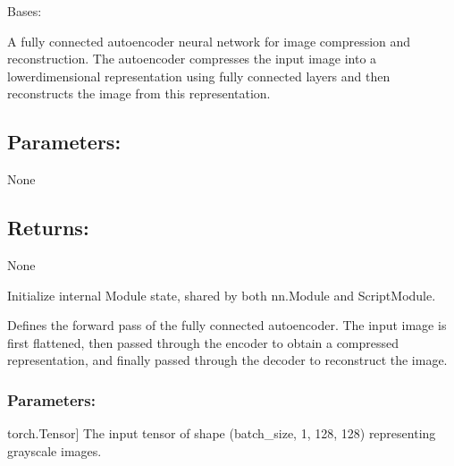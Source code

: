 \documentclass[a4paper,10pt,english]{sphinxmanual}
\begin{document}
\begin{fulllineitems}
\label{\detokenize{models:fireDiff.Models.fcae.FullyConnectedAutoencoder}}
\pysigstartsignatures
{}
\pysigstopsignatures
\sphinxAtStartPar
Bases: 

\sphinxAtStartPar
A fully connected autoencoder neural network for image compression and
reconstruction.
The autoencoder compresses the input image into a lower\sphinxhyphen{}dimensional
representation using fully connected layers and then reconstructs the
image from this representation.


\subsection{Parameters:}
\label{\detokenize{models:id44}}
\sphinxAtStartPar
None


\subsection{Returns:}
\label{\detokenize{models:id45}}
\sphinxAtStartPar
None

\sphinxAtStartPar
Initialize internal Module state, shared by both nn.Module and ScriptModule.

\begin{fulllineitems}
\label{\detokenize{models:fireDiff.Models.fcae.FullyConnectedAutoencoder.forward}}
\pysigstartsignatures
{}
\pysigstopsignatures
\sphinxAtStartPar
Defines the forward pass of the fully connected autoencoder. The input
image is first flattened, then passed through the encoder to obtain a
compressed representation, and finally passed through the decoder to
reconstruct the image.


\subsubsection{Parameters:}
\label{\detokenize{models:id46}}\begin{description}
\sphinxlineitem{x}{[}torch.Tensor{]}
\sphinxAtStartPar
The input tensor of shape (batch\_size, 1, 128, 128) representing
grayscale images.


\end{description}
\end{fulllineitems}
\end{fulllineitems}
\end{document}

